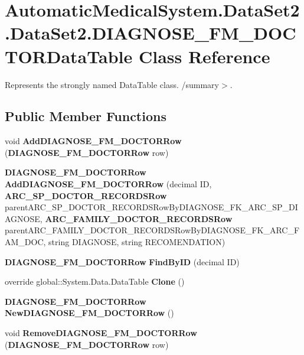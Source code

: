 \section{AutomaticMedicalSystem.DataSet2.DataSet2.DIAGNOSE\_\-FM\_\-DOCTORDataTable Class Reference}
\label{class_automatic_medical_system_1_1_data_set2_1_1_d_i_a_g_n_o_s_e___f_m___d_o_c_t_o_r_data_table}
Represents the strongly named DataTable class. /summary$>$.  


\subsection*{Public Member Functions}
\begin{CompactItemize}
\item 
void \textbf{AddDIAGNOSE\_\-FM\_\-DOCTORRow} ({\bf DIAGNOSE\_\-FM\_\-DOCTORRow} row)\label{class_automatic_medical_system_1_1_data_set2_1_1_d_i_a_g_n_o_s_e___f_m___d_o_c_t_o_r_data_table_67934c97d59b836a4f6f59c2558ec190}

\item 
{\bf DIAGNOSE\_\-FM\_\-DOCTORRow} \textbf{AddDIAGNOSE\_\-FM\_\-DOCTORRow} (decimal ID, {\bf ARC\_\-SP\_\-DOCTOR\_\-RECORDSRow} parentARC\_\-SP\_\-DOCTOR\_\-RECORDSRowByDIAGNOSE\_\-FK\_\-ARC\_\-SP\_\-DIAGNOSE, {\bf ARC\_\-FAMILY\_\-DOCTOR\_\-RECORDSRow} parentARC\_\-FAMILY\_\-DOCTOR\_\-RECORDSRowByDIAGNOSE\_\-FK\_\-ARC\_\-FAM\_\-DOC, string DIAGNOSE, string RECOMENDATION)\label{class_automatic_medical_system_1_1_data_set2_1_1_d_i_a_g_n_o_s_e___f_m___d_o_c_t_o_r_data_table_23dad55e74f59f3dbd9e2d5cee8f59b2}

\item 
{\bf DIAGNOSE\_\-FM\_\-DOCTORRow} \textbf{FindByID} (decimal ID)\label{class_automatic_medical_system_1_1_data_set2_1_1_d_i_a_g_n_o_s_e___f_m___d_o_c_t_o_r_data_table_ce2ac519e0abb1cdb34abb240e614af6}

\item 
override global::System.Data.DataTable \textbf{Clone} ()\label{class_automatic_medical_system_1_1_data_set2_1_1_d_i_a_g_n_o_s_e___f_m___d_o_c_t_o_r_data_table_fb629a198f9d39385294b6226ed24db7}

\item 
{\bf DIAGNOSE\_\-FM\_\-DOCTORRow} \textbf{NewDIAGNOSE\_\-FM\_\-DOCTORRow} ()\label{class_automatic_medical_system_1_1_data_set2_1_1_d_i_a_g_n_o_s_e___f_m___d_o_c_t_o_r_data_table_7d749f89d34d671085a49f172fea6ca7}

\item 
void \textbf{RemoveDIAGNOSE\_\-FM\_\-DOCTORRow} ({\bf DIAGNOSE\_\-FM\_\-DOCTORRow} row)\label{class_automatic_medical_system_1_1_data_set2_1_1_d_i_a_g_n_o_s_e___f_m___d_o_c_t_o_r_data_table_c5fb5f514b225400111ff99480c818ba}

\end{CompactItemize}
